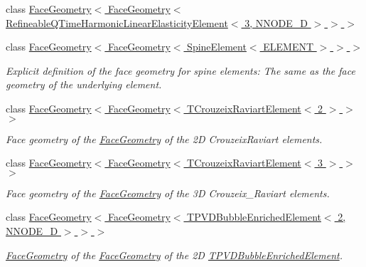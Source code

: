 \begin{DoxyCompactItemize}
class \hyperlink{classoomph_1_1FaceGeometry_3_01FaceGeometry_3_01RefineableQTimeHarmonicLinearElasticityElement_365a3e2a36dbcc1b106b027f6aabefda4}{Face\+Geometry$<$ Face\+Geometry$<$ Refineable\+Q\+Time\+Harmonic\+Linear\+Elasticity\+Element$<$ 3, N\+N\+O\+D\+E\+\_\+D $>$ $>$ $>$}
\item 
class \hyperlink{classoomph_1_1FaceGeometry_3_01FaceGeometry_3_01SpineElement_3_01ELEMENT_01_4_01_4_01_4}{Face\+Geometry$<$ Face\+Geometry$<$ Spine\+Element$<$ E\+L\+E\+M\+E\+N\+T $>$ $>$ $>$}
\begin{DoxyCompactList}\small\item\em Explicit definition of the face geometry for spine elements\+: The same as the face geometry of the underlying element. \end{DoxyCompactList}\item 
class \hyperlink{classoomph_1_1FaceGeometry_3_01FaceGeometry_3_01TCrouzeixRaviartElement_3_012_01_4_01_4_01_4}{Face\+Geometry$<$ Face\+Geometry$<$ T\+Crouzeix\+Raviart\+Element$<$ 2 $>$ $>$ $>$}
\begin{DoxyCompactList}\small\item\em Face geometry of the \hyperlink{classoomph_1_1FaceGeometry}{Face\+Geometry} of the 2D Crouzeix\+Raviart elements. \end{DoxyCompactList}\item 
class \hyperlink{classoomph_1_1FaceGeometry_3_01FaceGeometry_3_01TCrouzeixRaviartElement_3_013_01_4_01_4_01_4}{Face\+Geometry$<$ Face\+Geometry$<$ T\+Crouzeix\+Raviart\+Element$<$ 3 $>$ $>$ $>$}
\begin{DoxyCompactList}\small\item\em Face geometry of the \hyperlink{classoomph_1_1FaceGeometry}{Face\+Geometry} of the 3D Crouzeix\+\_\+\+Raviart elements. \end{DoxyCompactList}\item 
class \hyperlink{classoomph_1_1FaceGeometry_3_01FaceGeometry_3_01TPVDBubbleEnrichedElement_3_012_00_01NNODE__1D_01_4_01_4_01_4}{Face\+Geometry$<$ Face\+Geometry$<$ T\+P\+V\+D\+Bubble\+Enriched\+Element$<$ 2, N\+N\+O\+D\+E\+\_\+D $>$ $>$ $>$}
\begin{DoxyCompactList}\small\item\em \hyperlink{classoomph_1_1FaceGeometry}{Face\+Geometry} of the \hyperlink{classoomph_1_1FaceGeometry}{Face\+Geometry} of the 2D \hyperlink{classoomph_1_1TPVDBubbleEnrichedElement}{T\+P\+V\+D\+Bubble\+Enriched\+Element}. \end{DoxyCompactList}\item 

\end{DoxyCompactItemize}

